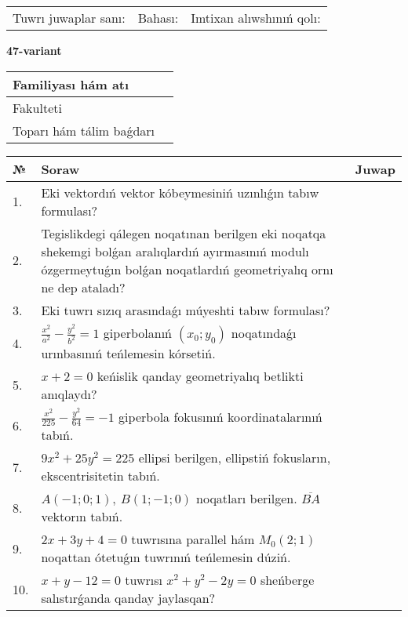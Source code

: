 \documentclass{article}
\begin{document}
\vspace{1cm}

\begin{tabular}{lll}
Tuwrı juwaplar sanı: \underline{\hspace{1.5cm}} & 
Bahası: \underline{\hspace{1.5cm}} & 
Imtixan alıwshınıń qolı: \underline{\hspace{2cm}} \\
\end{tabular}

\egroup

\newpage


\textbf{47-variant}\\

\bgroup
\def\arraystretch{1.6} %

\begin{tabular}{|m{5.7cm}|m{9.5cm}|}
\hline
Familiyası hám atı & \\
\hline
Fakulteti  & \\
\hline
Toparı hám tálim baǵdarı  & \\
\hline
\end{tabular}

\vspace{1cm}

\begin{tabular}{|m{0.7cm}|m{10cm}|m{4cm}|}
\hline
№ & Soraw & Juwap \\
\hline
1. & Eki vektordıń vektor kóbeymesiniń uzınlıǵın tabıw formulası? &  \\
\hline
2. & Tegislikdegi qálegen noqatınan berilgen eki noqatqa shekemgi bolǵan aralıqlardıń ayırmasınıń modulı ózgermeytuǵın bolǵan noqatlardıń geometriyalıq ornı ne dep ataladı? &  \\
\hline
3. & Eki tuwrı sızıq arasındaǵı múyeshti tabıw formulası? &  \\
\hline
4. & $\frac{x^2}{a^2}-\frac{y^2}{b^2}=1$ giperbolanıń $(x_0;y_0)$ noqatındaǵı urınbasınıń teńlemesin kórsetiń. &  \\
\hline
5. & $x+2=0$ keńislik qanday geometriyalıq betlikti anıqlaydı? &  \\
\hline
6. & $\frac{x^{2}}{225}-\frac{y^{2}}{64}=-1$ giperbola fokusınıń koordinatalarınıń tabıń. &  \\
\hline
7. & $9x^{2}+25y^{2}=225$ ellipsi berilgen, ellipstiń fokusların, ekscentrisitetin tabıń. &  \\
\hline
8. & $A (-1;0;1),\ B (1;-1;0)$ noqatları berilgen. $\overline{BA}$ vektorın tabıń. &  \\
\hline
9. & $2x+3y+4=0$ tuwrısına parallel hám $M_{0} (2;1)$ noqattan ótetuǵın tuwrınıń teńlemesin dúziń. &  \\
\hline
10. & $x+y-12=0$ tuwrısı $x^{2}+y^{2}-2y=0$ sheńberge salıstırǵanda qanday jaylasqan? &  \\
\hline
\end{tabular}
\end{document}
